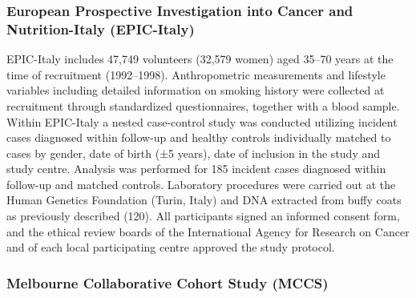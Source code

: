 \documentclass[11pt,oneside]{bristolthesis}
\begin{document}
\hypertarget{european-prospective-investigation-into-cancer-and-nutrition-italy-epic-italy}{%
\subsubsection{European Prospective Investigation into Cancer and Nutrition-Italy (EPIC-Italy)}\label{european-prospective-investigation-into-cancer-and-nutrition-italy-epic-italy}}

EPIC-Italy includes 47,749 volunteers (32,579 women) aged 35--70 years at the time of recruitment (1992--1998). Anthropometric measurements and lifestyle variables including detailed information on smoking history were collected at recruitment through standardized questionnaires, together with a blood sample. Within EPIC-Italy a nested case-control study was conducted utilizing incident cases diagnosed within follow-up and healthy controls individually matched to cases by gender, date of birth (±5 years), date of inclusion in the study and study centre. Analysis was performed for 185 incident cases diagnosed within follow-up and matched controls. Laboratory procedures were carried out at the Human Genetics Foundation (Turin, Italy) and DNA extracted from buffy coats as previously described (120). All participants signed an informed consent form, and the ethical review boards of the International Agency for Research on Cancer and of each local participating centre approved the study protocol.

\hypertarget{melbourne-collaborative-cohort-study-mccs}{%
\subsubsection{Melbourne Collaborative Cohort Study (MCCS)}\label{melbourne-collaborative-cohort-study-mccs}}
\end{document}
